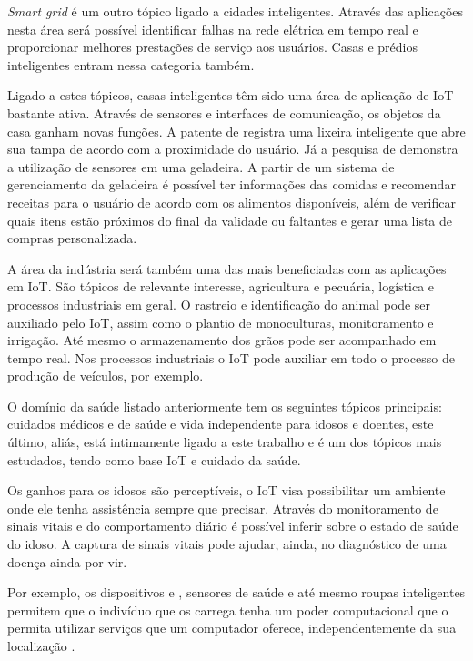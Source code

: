 \textit{Smart grid} é um outro tópico ligado a cidades inteligentes. Através
das aplicações nesta área será possível identificar falhas na rede elétrica em 
tempo real e proporcionar melhores prestações de serviço aos usuários. Casas
e prédios inteligentes entram nessa categoria também.

Ligado a estes tópicos, casas inteligentes têm sido uma área de aplicação de
IoT bastante ativa. Através de sensores e interfaces de comunicação, os objetos
da casa ganham novas funções. A patente de  registra
uma lixeira inteligente que abre sua tampa de acordo com a proximidade do
usuário. Já a pesquisa de  demonstra a utilização de
sensores em uma geladeira. A partir de um sistema de gerenciamento da geladeira
é possível ter informações das comidas e recomendar receitas para o usuário de
acordo com os alimentos disponíveis, além de verificar quais itens estão
próximos do final da validade ou faltantes e gerar uma lista de compras
personalizada.

A área da indústria será também uma das mais beneficiadas com as aplicações em IoT.
São tópicos de relevante interesse, agricultura e pecuária, logística e 
processos industriais em geral. O rastreio e identificação do animal pode ser
auxiliado pelo IoT, assim como o plantio de monoculturas, monitoramento e 
irrigação. Até mesmo o armazenamento dos grãos pode ser acompanhado em tempo
real. Nos processos industriais o IoT pode auxiliar em todo o processo
de produção de veículos, por exemplo. 

O domínio da saúde listado anteriormente tem os seguintes tópicos principais:
cuidados médicos e de saúde e vida independente para idosos e doentes, este último, aliás,
está intimamente ligado a este trabalho e é um dos tópicos mais estudados, tendo
como base IoT e cuidado da saúde.

Os ganhos para os idosos são perceptíveis, o IoT visa possibilitar um ambiente
onde ele tenha assistência sempre que precisar. Através do monitoramento de 
sinais vitais e do comportamento diário é possível inferir sobre o estado 
de saúde do idoso. A captura de sinais vitais pode ajudar, ainda, no diagnóstico
de uma doença ainda por vir.

Por exemplo, os dispositivos \smartphones[] e \smartwatches, sensores de saúde e até 
mesmo roupas inteligentes permitem que o indivíduo que os carrega tenha um poder 
computacional que o permita utilizar serviços que um computador oferece, 
independentemente da sua localização \cite{de2003computaccao}.

